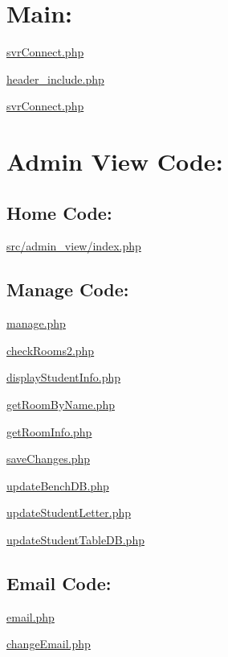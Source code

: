 \hypertarget{index_setup}{}\section{\-Main\-:}\label{index_setup}
\hyperlink{svrConnect_8php}{svr\-Connect.\-php}\par
 \hyperlink{header__include_8php}{header\-\_\-include.\-php}\par
 \hyperlink{svrConnect_8php}{svr\-Connect.\-php}\par
\hypertarget{index_admin_sec}{}\section{\-Admin View Code\-:}\label{index_admin_sec}
\hypertarget{index_Home}{}\subsection{\-Home Code\-:}\label{index_Home}
\hyperlink{admin__view_2index_8php}{src/admin\-\_\-view/index.\-php} \par
\hypertarget{index_Manage}{}\subsection{\-Manage Code\-:}\label{index_Manage}
\hyperlink{manage_8php}{manage.\-php} \par
 \hyperlink{checkRooms2_8php}{check\-Rooms2.\-php} \par
 \hyperlink{displayStudentInfo_8php}{display\-Student\-Info.\-php} \par
 \hyperlink{getRoomByName_8php}{get\-Room\-By\-Name.\-php} \par
 \hyperlink{getRoomInfo_8php}{get\-Room\-Info.\-php} \par
 \hyperlink{saveChanges_8php}{save\-Changes.\-php} \par
 \hyperlink{updateBenchDB_8php}{update\-Bench\-D\-B.\-php} \par
 \hyperlink{updateStudentLetter_8php}{update\-Student\-Letter.\-php} \par
 \hyperlink{updateStudentTableDB_8php}{update\-Student\-Table\-D\-B.\-php} \par
\hypertarget{index_emails}{}\subsection{\-Email Code\-:}\label{index_emails}
\hyperlink{email_8php}{email.\-php} \par
 \hyperlink{changeEmail_8php}{change\-Email.\-php} \par
